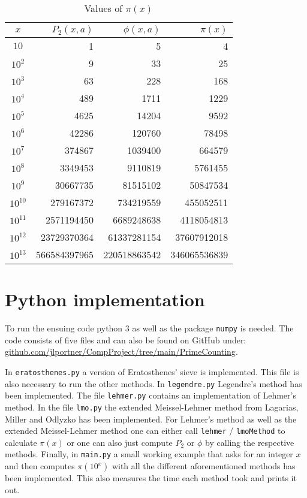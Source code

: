 \begin{table}[htpb]
	\centering
	\begin{tabular}{|c|r|r|r|}
		\hline
		$x$ & $P_2(x,a)$ & $\phi(x,a)$ & $\pi(x)$\\ \hline
        $10$ & 1 & 5 & 4\\
        $10^2$ & 9 & 33 & 25\\
        $10^3$ & 63 & 228 & 168\\
        $10^4$ & 489 & 1711 & 1229\\
        $10^5$ & 4625 & 14204 & 9592\\
        $10^6$ & 42286 & 120760 & 78498\\
        $10^7$ & 374867 & 1039400 & 664579\\
        $10^8$ & 3349453 & 9110819 & 5761455\\
		$10^{9}$ & 30667735 & 81515102 & 50847534\\
		$10^{10}$ & 279167372 & 734219559 & 455052511\\
        $10^{11}$ & 2571194450 & 6689248638 & 4118054813\\
        $10^{12}$ & 23729370364 & 61337281154 & 37607912018\\
        $10^{13}$ & 566584397965 & 220518863542 & 346065536839\\ \hline
        
	\end{tabular}
	\caption{Values of $\pi(x)$}
	\label{tab:computations}
\end{table}


\newpage
\printbibliography
\newpage
\appendix
\section{Python implementation}
To run the ensuing code python 3 as well as the package \texttt{numpy} is needed.
The code consists of five files and can also be found on GitHub under: \url{github.com/jlportner/CompProject/tree/main/PrimeCounting}.

In \texttt{eratosthenes.py} a version of Eratosthenes' sieve is implemented. This file is also necessary to run the other methods.
In \texttt{legendre.py} Legendre's method has been implemented. 
The file \texttt{lehmer.py} contains an implementation of Lehmer's method.
In the file \texttt{lmo.py} the extended Meissel-Lehmer method from Lagarias, Miller and Odlyzko has been implemented. 
For Lehmer's method as well as the extended Meissel-Lehmer method one can either call \texttt{lehmer} / \texttt{lmoMethod} to calculate $\pi(x)$ or one can also 
just compute $P_2$ or $\phi$  by calling the respective methods.
Finally, in \texttt{main.py} a small working example that asks for an integer $x$ and then computes $\pi(10^{x})$ with all the different aforementioned methods 
has been implemented. This also measures the time each method took and prints it out.

